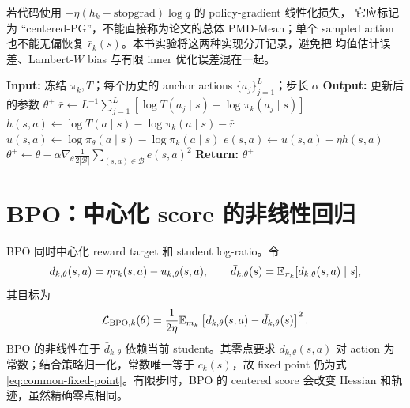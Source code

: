 若代码使用
$-\eta(h_k-\text{stopgrad})\log q$ 的 policy-gradient 线性化损失，
它应标记为 ``centered-PG''，不能直接称为论文的总体 PMD-Mean；单个 sampled
action 也不能无偏恢复 $\bar r_k(s)$。本书实验将这两种实现分开记录，避免把
均值估计误差、Lambert-$W$ bias 与有限 inner 优化误差混在一起。

\begin{algorithm}
\caption{PMD-Mean inner update\\{\small\textit{Semantics: 根据均值近似平方目标重构；不是 exact log-partition 回归}}}
\begin{algorithmic}
\STATE \textbf{Input:} 冻结 $\pi_k,T$；每个历史的 anchor actions $\{a_j\}_{j=1}^{L}$；步长 $\alpha$
\STATE \textbf{Output:} 更新后的参数 $\theta^+$
    \STATE $\bar r\gets L^{-1}\sum_{j=1}^{L}[\log T(a_j\mid s)-\log\pi_k(a_j\mid s)]$
        \STATE $h(s,a)\gets \log T(a\mid s)-\log\pi_k(a\mid s)-\bar r$
        \STATE $u(s,a)\gets \log\pi_\theta(a\mid s)-\log\pi_k(a\mid s)$
        \STATE $e(s,a)\gets u(s,a)-\eta h(s,a)$
    \ENDFOR
\ENDFOR
\STATE $\theta^+\gets\theta-\alpha\nabla_\theta\frac{1}{2|\mathcal B|}\sum_{(s,a)\in\mathcal B}e(s,a)^2$
\STATE {}
\STATE \textbf{Return:} $\theta^+$
\end{algorithmic}
\end{algorithm}

\section{BPO：中心化 score 的非线性回归}
\label{sec:bpo-unified}

BPO 同时中心化 reward target 和 student log-ratio。令
\[
 d_{k,\theta}(s,a)=\eta r_k(s,a)-u_{k,\theta}(s,a),
 \qquad
 \bar d_{k,\theta}(s)=\mathbb{E}_{\pi_k}[d_{k,\theta}(s,a)\mid s],
\]
其目标为
\begin{equation}
\label{eq:bpo-objective}
 \mathcal L_{\mathrm{BPO},k}(\theta)
 =\frac{1}{2\eta}\mathbb{E}_{m_k}
 \left[d_{k,\theta}(s,a)-\bar d_{k,\theta}(s)
 \right]^2.
\end{equation}
BPO 的非线性在于 $\bar d_{k,\theta}$ 依赖当前 student。其零点要求 $d_{k,\theta}(s,a)$ 对 action 为常数；结合策略归一化，常数唯一等于 $c_k(s)$，故 fixed point 仍为式 \eqref{eq:common-fixed-point}。有限步时，BPO 的 centered score 会改变 Hessian 和轨迹，虽然精确零点相同。

